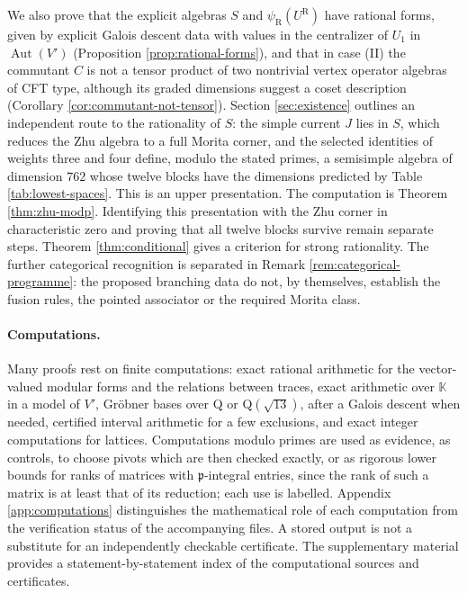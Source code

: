 \documentclass[leqno]{article}
\newcommand{\K}{\ensuremath{\mathbb{K}}}
\newcommand{\Q}{\mathrm{Q}}
\numberwithin{equation}{section}
\begin{document}
We also prove that the explicit algebras $S$ and $\psi_{\mathrm R}(U^{\mathrm R})$ have rational forms, given by explicit Galois descent data with values in the centralizer of $U_1$ in $\operatorname{Aut}(V')$ (Proposition \ref{prop:rational-forms}), and that in case (II) the commutant $C$ is not a tensor product of two nontrivial vertex operator algebras of CFT type, although its graded dimensions suggest a coset description (Corollary \ref{cor:commutant-not-tensor}). Section \ref{sec:existence} outlines an independent route to the rationality of $S$: the simple current $J$ lies in $S$, which reduces the Zhu algebra to a full Morita corner, and the selected identities of weights three and four define, modulo the stated primes, a semisimple algebra of dimension $762$ whose twelve blocks have the dimensions predicted by Table \ref{tab:lowest-spaces}. This is an upper presentation. The computation is Theorem \ref{thm:zhu-modp}. Identifying this presentation with the Zhu corner in characteristic zero and proving that all twelve blocks survive remain separate steps. Theorem \ref{thm:conditional} gives a criterion for strong rationality. The further categorical recognition is separated in Remark \ref{rem:categorical-programme}: the proposed branching data do not, by themselves, establish the fusion rules, the pointed associator or the required Morita class.

\paragraph{Computations.} Many proofs rest on finite computations: exact rational arithmetic for the vector-valued modular forms and the relations between traces, exact arithmetic over $\K$ in a model of $V'$, Gröbner bases over $\Q$ or $\Q(\sqrt{13})$, after a Galois descent when needed, certified interval arithmetic for a few exclusions, and exact integer computations for lattices. Computations modulo primes are used as evidence, as controls, to choose pivots which are then checked exactly, or as rigorous lower bounds for ranks of matrices with $\mathfrak p$-integral entries, since the rank of such a matrix is at least that of its reduction; each use is labelled. Appendix \ref{app:computations} distinguishes the mathematical role of each computation from the verification status of the accompanying files. A stored output is not a substitute for an independently checkable certificate. The supplementary material provides a statement-by-statement index of the computational sources and certificates.
\end{document}
